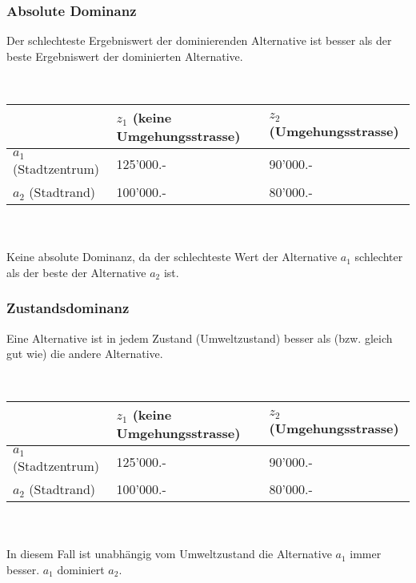 \subsubsection{Absolute Dominanz}
Der schlechteste Ergebniswert der dominierenden Alternative ist besser als der beste Ergebniswert der
dominierten Alternative.
\begin{example} \\
	\begin{tabular}{|l|l|l|}
		\hline
		& $z_1$ (keine Umgehungsstrasse) & $z_2$ (Umgehungsstrasse) \\ \hline
		$a_1$ (Stadtzentrum) & 125'000.- & 90'000.- \\ \hline
		$a_2$ (Stadtrand) & 100'000.- & 80'000.- \\ \hline
	\end{tabular}\\ \ \\
	Keine absolute Dominanz, da der schlechteste Wert der Alternative $a_1$ schlechter als der beste der Alternative $a_2$ ist.
\end{example}

\subsubsection{Zustandsdominanz}
Eine Alternative ist in jedem Zustand (Umweltzustand) besser als (bzw. gleich gut wie) die andere Alternative.
\begin{example} \\
	\begin{tabular}{|l|l|l|}
		\hline
		& $z_1$ (keine Umgehungsstrasse) & $z_2$ (Umgehungsstrasse) \\ \hline
		$a_1$ (Stadtzentrum) & 125'000.- & 90'000.- \\ \hline
		$a_2$ (Stadtrand) & 100'000.- & 80'000.- \\ \hline
	\end{tabular}\\ \ \\
	In diesem Fall ist unabhängig vom Umweltzustand die Alternative $a_1$ immer besser. $a_1$ dominiert $a_2$.
\end{example}
